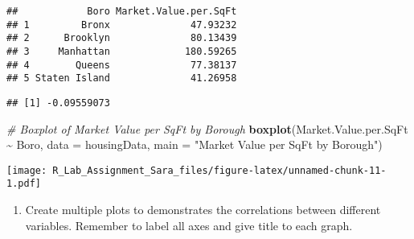 \documentclass[
]{article}
\newenvironment{Shaded}{\begin{snugshade}}{\end{snugshade}}
\newcommand{\AttributeTok}[1]{\textcolor[rgb]{0.13,0.29,0.53}{#1}}
\newcommand{\CommentTok}[1]{\textcolor[rgb]{0.56,0.35,0.01}{\textit{#1}}}
\newcommand{\FunctionTok}[1]{\textcolor[rgb]{0.13,0.29,0.53}{\textbf{#1}}}
\newcommand{\NormalTok}[1]{#1}
\newcommand{\SpecialCharTok}[1]{\textcolor[rgb]{0.81,0.36,0.00}{\textbf{#1}}}
\newcommand{\StringTok}[1]{\textcolor[rgb]{0.31,0.60,0.02}{#1}}
\providecommand{\tightlist}{%
  \setlength{\itemsep}{0pt}\setlength{\parskip}{0pt}}
\begin{document}
\begin{verbatim}
##            Boro Market.Value.per.SqFt
## 1         Bronx              47.93232
## 2      Brooklyn              80.13439
## 3     Manhattan             180.59265
## 4        Queens              77.38137
## 5 Staten Island              41.26958
\end{verbatim}

\begin{Shaded}
\end{Shaded}

\begin{verbatim}
## [1] -0.09559073
\end{verbatim}

\begin{Shaded}
\begin{Highlighting}[]
\CommentTok{\# Boxplot of Market Value per SqFt by Borough}
\FunctionTok{boxplot}\NormalTok{(Market.Value.per.SqFt }\SpecialCharTok{\textasciitilde{}}\NormalTok{ Boro, }\AttributeTok{data =}\NormalTok{ housingData, }\AttributeTok{main =} \StringTok{"Market Value per SqFt by Borough"}\NormalTok{)}
\end{Highlighting}
\end{Shaded}

\texttt{[image: R\_Lab\_Assignment\_Sara\_files/figure-latex/unnamed-chunk-11-1.pdf]}

\begin{enumerate}
\def\labelenumi{\alph{enumi}.}
\setcounter{enumi}{1}
\tightlist
\item
  Create multiple plots to demonstrates the correlations between
  different variables. Remember to label all axes and give title to each
  graph.
\end{enumerate}

\begin{Shaded}
\end{Shaded}
\end{document}

